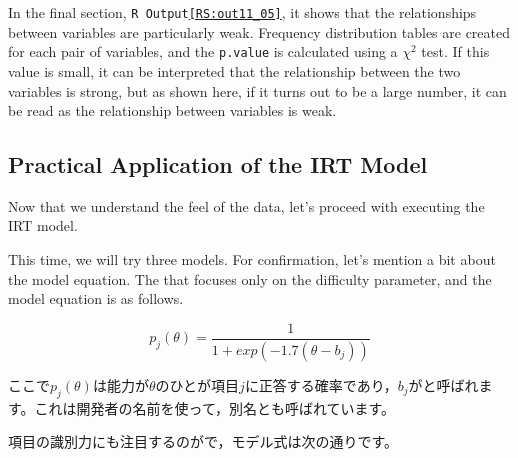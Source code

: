 \documentclass{ltjsbook}
\begin{document}
In the final section, \texttt{R Output\ref{RS:out11_05}}, it shows that the relationships between variables are particularly weak. Frequency distribution tables are created for each pair of variables, and the \texttt{p.value} is calculated using a $\chi^2$ test. If this value is small, it can be interpreted that the relationship between the two variables is strong, but as shown here, if it turns out to be a large number, it can be read as the relationship between variables is weak.

\subsection{Practical Application of the IRT Model}
Now that we understand the feel of the data, let's proceed with executing the IRT model.

This time, we will try three models. For confirmation, let's mention a bit about the model equation. The  that focuses only on the difficulty parameter, and the model equation is as follows.

\[ p_j(\theta) = \frac{1}{1+exp(-1.7 (\theta -b_j))} \]

ここで$p_j(\theta)$は能力が$\theta$のひとが項目$j$に正答する確率であり，$b_j$がと呼ばれます。これは開発者の名前を使って，別名とも呼ばれています。

項目の識別力にも注目するのがで，モデル式は次の通りです。
\end{document}

